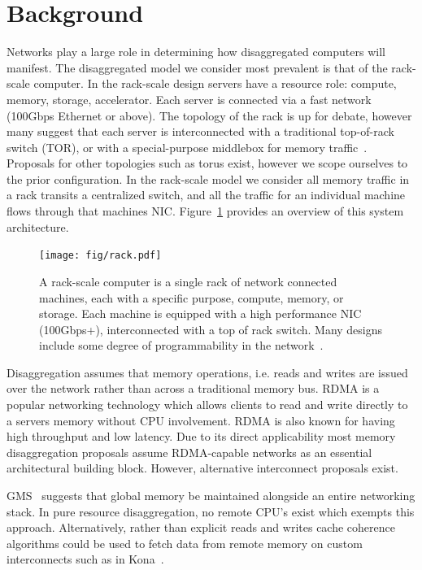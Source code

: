 \section{Background}

Networks play a large role in determining how disaggregated computers will
manifest.  The disaggregated model we consider most prevalent is that of the
rack-scale computer. In the rack-scale design servers have a resource role:
compute, memory, storage, accelerator. Each server is connected via a fast
network (100Gbps Ethernet or above). The topology of the rack is up for debate,
however many suggest that each server is interconnected with a traditional
top-of-rack switch (TOR), or with a special-purpose middlebox for memory
traffic~\cite{disandapp}. Proposals for other topologies such as torus exist,
however we scope ourselves to the prior configuration. In the rack-scale model
we consider all memory traffic in a rack transits a centralized switch, and all
the traffic for an individual machine flows through that machines NIC.
Figure~\ref{fig:rackscale} provides an overview of this system architecture.

\begin{figure}[t]
    \begin{centering}
    \texttt{[image: fig/rack.pdf]}
    \caption{ A rack-scale computer is a single rack of network connected
    machines, each with a specific purpose, compute, memory, or storage. Each
    machine is equipped with a high performance NIC (100Gbps+), interconnected
    with a top of rack switch. Many designs include some degree of
    programmability in the network~\cite{disandapp}.
    }
    \label{fig:rackscale}
    \end{centering}
\end{figure}


Disaggregation assumes that memory operations, i.e. reads and writes are issued
over the network rather than across a traditional memory bus. RDMA is a popular
networking technology which allows clients to read and write directly to a
servers memory without CPU involvement. RDMA is also known for having high
throughput and low latency. Due to its direct applicability most memory
disaggregation proposals assume RDMA-capable networks as an essential
architectural building block. However, alternative interconnect proposals exist.

GMS~\cite{gms} suggests that global memory be maintained alongside an entire
networking stack. In pure resource disaggregation, no remote CPU's exist which
exempts this approach.  Alternatively, rather than explicit reads and writes
cache coherence algorithms could be used to fetch data from remote memory on
custom interconnects such as in Kona~\cite{kona}.

